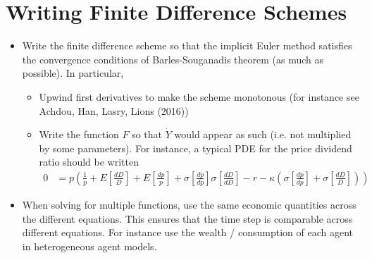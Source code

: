 \documentclass[english]{article}
\begin{document}
\section{Writing Finite Difference Schemes}
\begin{itemize}
	\item 
	Write the finite difference scheme so that the implicit Euler method satisfies the convergence conditions of Barles-Souganadis theorem (as much as possible). In particular,
	\begin{itemize}
		\item Upwind first derivatives to make the scheme monotonous (for instance see Achdou, Han, Lasry, Lions (2016))
		\item Write the function $F$ so that $\dot{Y}$ would appear as such (i.e. not multiplied by some parameters). For instance, a typical PDE for the price dividend ratio should be written
		\begin{align*}
			0 &= p (\frac{1}{p} + E[\frac{dD}{D}] + E[\frac{dp}{p}] + \sigma[\frac{dp}{dp}]\sigma[\frac{dD}{dD}] - r - \kappa(\sigma[\frac{dp}{dp}] + \sigma[\frac{dD}{D}]))
		\end{align*}
	\end{itemize}
	\item When solving for multiple functions, use the same economic quantities across the different equations. This ensures that the time step is comparable across different equations. For instance use the wealth / consumption of each agent in heterogeneous agent models.
\end{itemize}


\end{document}
